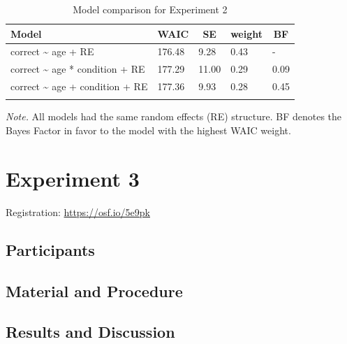 \documentclass[man,floatsintext]{apa6}
\begin{document}
\begin{table}[tbp]
\begin{center}
\begin{threeparttable}
\caption{\label{tab:table2}Model comparison for Experiment 2}
\begin{tabular}{lllll}
\toprule
Model & \multicolumn{1}{c}{WAIC} & \multicolumn{1}{c}{SE} & \multicolumn{1}{c}{weight} & \multicolumn{1}{c}{BF}\\
\midrule
correct \textasciitilde{} age + RE & 176.48 & 9.28 & 0.43 & -\\
correct \textasciitilde{} age * condition + RE & 177.29 & 11.00 & 0.29 & 0.09\\
correct \textasciitilde{} age + condition + RE & 177.36 & 9.93 & 0.28 & 0.45\\
\bottomrule
\addlinespace
\end{tabular}
\begin{tablenotes}[para]
\normalsize{\textit{Note.} All models had the same random effects (RE) structure. BF denotes the Bayes Factor in favor to the model with the highest WAIC weight.}
\end{tablenotes}
\end{threeparttable}
\end{center}
\end{table}

\section{Experiment 3}\label{experiment-3}

Registration: \url{https://osf.io/5e9pk}

\subsection{Participants}\label{participants-2}

\subsection{Material and Procedure}\label{material-and-procedure-1}

\subsection{Results and Discussion}\label{results-and-discussion-1}
\end{document}
